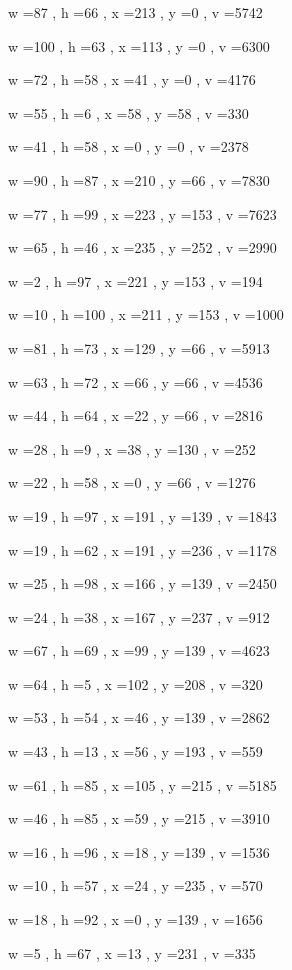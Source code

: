 \documentclass[11pt]{article}
\begin{document}
w =87 , h =66 , x =213 , y =0 , v =5742
\par
w =100 , h =63 , x =113 , y =0 , v =6300
\par
w =72 , h =58 , x =41 , y =0 , v =4176
\par
w =55 , h =6 , x =58 , y =58 , v =330
\par
w =41 , h =58 , x =0 , y =0 , v =2378
\par
w =90 , h =87 , x =210 , y =66 , v =7830
\par
w =77 , h =99 , x =223 , y =153 , v =7623
\par
w =65 , h =46 , x =235 , y =252 , v =2990
\par
w =2 , h =97 , x =221 , y =153 , v =194
\par
w =10 , h =100 , x =211 , y =153 , v =1000
\par
w =81 , h =73 , x =129 , y =66 , v =5913
\par
w =63 , h =72 , x =66 , y =66 , v =4536
\par
w =44 , h =64 , x =22 , y =66 , v =2816
\par
w =28 , h =9 , x =38 , y =130 , v =252
\par
w =22 , h =58 , x =0 , y =66 , v =1276
\par
w =19 , h =97 , x =191 , y =139 , v =1843
\par
w =19 , h =62 , x =191 , y =236 , v =1178
\par
w =25 , h =98 , x =166 , y =139 , v =2450
\par
w =24 , h =38 , x =167 , y =237 , v =912
\par
w =67 , h =69 , x =99 , y =139 , v =4623
\par
w =64 , h =5 , x =102 , y =208 , v =320
\par
w =53 , h =54 , x =46 , y =139 , v =2862
\par
w =43 , h =13 , x =56 , y =193 , v =559
\par
w =61 , h =85 , x =105 , y =215 , v =5185
\par
w =46 , h =85 , x =59 , y =215 , v =3910
\par
w =16 , h =96 , x =18 , y =139 , v =1536
\par
w =10 , h =57 , x =24 , y =235 , v =570
\par
w =18 , h =92 , x =0 , y =139 , v =1656
\par
w =5 , h =67 , x =13 , y =231 , v =335
\par
\newpage
\end{document}
